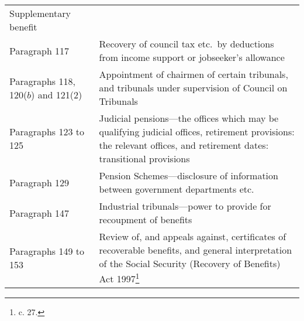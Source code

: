 \documentclass[12pt,a4paper]{article}
\begin{document}
{\begin{longtable}{p{183pt}p{183pt}}
	Supplementary benefit\\
\hspace{1em}
    Paragraph 117 &

	Recovery of council tax etc.\ by deductions from income support or jobseeker’s allowance\\
\hspace{1em}
    Paragraphs 118, 120($b$)  and 121(2) &

	Appointment of chairmen of certain tribunals, and tribunals under supervision of Council on Tribunals\\
\hspace{1em}
    Paragraphs 123 to 125 &

	Judicial pensions—the offices which may be qualifying judicial offices, retirement provisions: the relevant offices, and retirement dates: transitional provisions\\
\hspace{1em}
    Paragraph 129 &

	Pension Schemes—disclosure of information between government departments etc.\\
\hspace{1em}
    Paragraph 147 &

	Industrial tribunals—power to provide for recoupment of benefits\\
\hspace{1em}
    Paragraphs 149 to 153 &

	Review of, and appeals against, certificates of recoverable benefits, and general interpretation of the Social Security (Recovery of Benefits) Act 1997\footnote{\frenchspacing 1997 c. 27.}\\


\end{longtable}}
\end{document}
